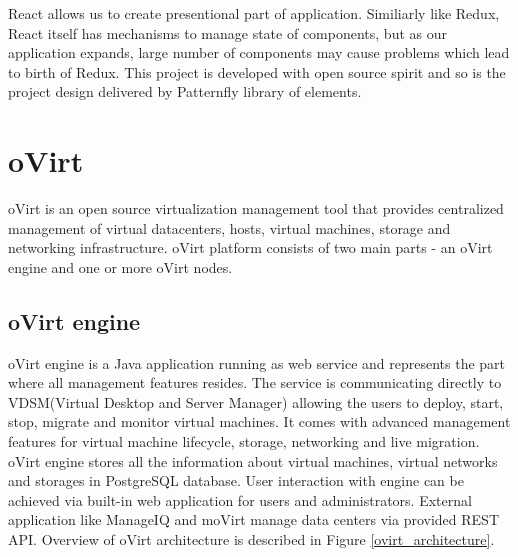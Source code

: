 React allows us to create presentional part of application. Similiarly like Redux, React itself has mechanisms to manage state of components, but as our application expands, large number of components may cause problems which lead to birth of Redux. This project is developed with open source spirit and so is the project design delivered by Patternfly\cite{Patternfly} library of elements.

\chapter{oVirt}
oVirt is an open source virtualization management tool that provides centralized management of virtual datacenters, hosts, virtual machines, storage and networking infrastructure. oVirt platform consists of two main parts - an oVirt engine and one or more oVirt nodes.


\section{oVirt engine}
oVirt engine is a Java application running as web service and represents the part where all management features resides. The service is communicating directly to VDSM(Virtual Desktop and Server Manager) allowing the users to deploy, start, stop, migrate and monitor virtual machines. It comes with advanced management features for virtual machine lifecycle, storage, networking and live migration. oVirt engine stores all the information about virtual machines, virtual networks and storages in PostgreSQL\cite{postgre} database. User interaction with engine can be achieved via built-in web application for users and administrators. External application like ManageIQ and moVirt manage data centers via provided REST API. Overview of oVirt architecture is described in Figure \ref{ovirt_architecture}.

